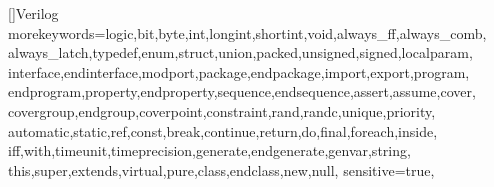 %
%
%
%
%        
%
%


[]{Verilog}{%
  morekeywords={logic,bit,byte,int,longint,shortint,void,always_ff,always_comb,%
    always_latch,typedef,enum,struct,union,packed,unsigned,signed,localparam,%
    interface,endinterface,modport,package,endpackage,import,export,program,%
    endprogram,property,endproperty,sequence,endsequence,assert,assume,cover,%
    covergroup,endgroup,coverpoint,constraint,rand,randc,unique,priority,%
    automatic,static,ref,const,break,continue,return,do,final,foreach,inside,%
    iff,with,timeunit,timeprecision,generate,endgenerate,genvar,string,%
    this,super,extends,virtual,pure,class,endclass,new,null},%
  sensitive=true,%
}

\lstset{style=codeprint}

\newcommand{\srcentry}[4]{%
  \subsection{\texttt{#2}}%
  \noindent\small #3\par\medskip\nopagebreak
}

